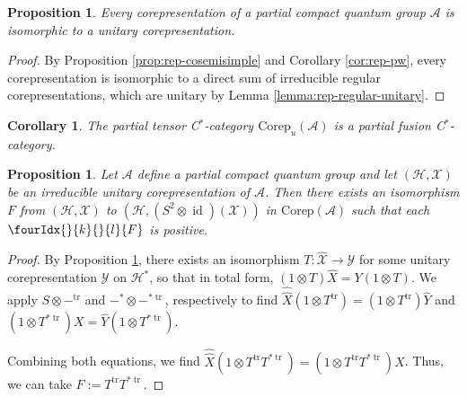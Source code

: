 \documentclass[10pt]{article}
\DeclareMathOperator{\id}{id}
\DeclareMathOperator{\tr}{\mathrm{tr}}
\newcommand{\dual}[1]{#1^{*}}
\newcommand{\dualop}[1]{#1^{\tr}}
\newcommand{\dualco}[1]{\hat{#1}}
\newcommand{\Corep}{\mathrm{Corep}}
\newcommand{\Hsp}{\mathcal{H}}
\newcommand{\Gr}[5]{\fourIdx{#2}{#4}{#3}{#5}{#1}}%
\newcommand{\Gru}[3]{\Gr{#1}{}{}{#2}{#3}}
\newtheorem{Prop}[Theorem]{Proposition}
\newtheorem{Cor}[Theorem]{Corollary}
\theoremstyle{definition}
\numberwithin{equation}{section}
\begin{document}
\begin{Prop} \label{prop:rep-unitarisable} Every 
  corepresentation of a partial compact quantum group $\mathscr{A}$ is
  isomorphic to a unitary corepresentation.
\end{Prop}
\begin{proof}
  By Proposition \ref{prop:rep-cosemisimple} and Corollary
  \ref{cor:rep-pw}, every corepresentation is isomorphic to a direct
  sum of irreducible regular corepresentations, which are unitary by
  Lemma \ref{lemma:rep-regular-unitary}.
\end{proof}
\begin{Cor} The partial tensor C$^*$-category $\Corep_u(\mathscr{A})$ is a partial fusion C$^{*}$-category.
\end{Cor}

\begin{Prop} \label{prop:rep-unitary-bidual}
  Let $\mathscr{A}$ define a partial compact quantum group and let
  $(\Hsp,\mathscr{X})$ be an irreducible unitary corepresentation of
  $\mathscr{A}$.  Then there exists an isomorphism $F$
  from $(\Hsp,\mathscr{X})$ to 
  $(\Hsp,(S^{2} \otimes \id)(\mathscr{X}))$ in $\Corep(\mathscr{A})$ such
  that each $\Gru{F}{k}{l}$ is positive.
\end{Prop}
\begin{proof}
 By Proposition \ref{prop:rep-unitarisable}, there exists an
  isomorphism $T \colon \dualco{\mathscr{X}} \to \mathscr{Y}$ for some
  unitary corepresentation $\mathscr{Y}$ on $\dual{\Hsp}$, so that in total form,
  $(1\otimes T)\dualco{X} = Y(1 \otimes T)$.
We  apply   $S \otimes -^{\tr}$ and $-^{*} \otimes -^{*\tr}$,
respectively to find $ \dualco{\dualco{X}}(1 \otimes \dualop{T}) = (1 \otimes
  \dualop{T})\dualco{Y}$ and $(1 \otimes T^{*\tr})X=\dualco{Y}(1\otimes T^{*\tr}).$

Combining both equations, we
find $\dualco{\dualco{X}}(1 \otimes \dualop{T}T^{*\tr})=(1 \otimes
\dualop{T}T^{*\tr})X$. Thus, we can take
$F:=\dualop{T}T^{*\tr}$.
\end{proof}
\end{document}
